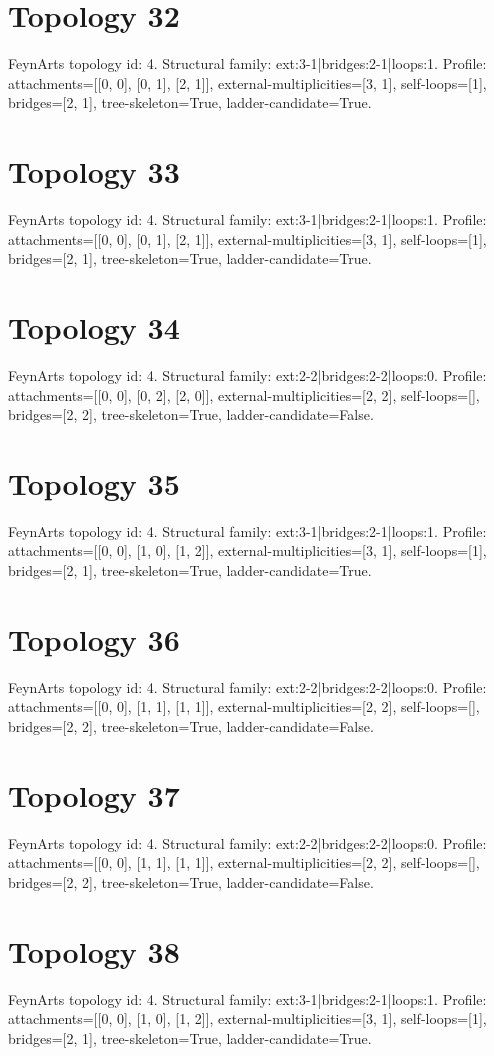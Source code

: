 \documentclass{article}
\begin{document}
\section*{Topology 32}
FeynArts topology id: 4.
Structural family: ext:3-1|bridges:2-1|loops:1.
Profile: attachments=[[0, 0], [0, 1], [2, 1]], external-multiplicities=[3, 1], self-loops=[1], bridges=[2, 1], tree-skeleton=True, ladder-candidate=True.
\section*{Topology 33}
FeynArts topology id: 4.
Structural family: ext:3-1|bridges:2-1|loops:1.
Profile: attachments=[[0, 0], [0, 1], [2, 1]], external-multiplicities=[3, 1], self-loops=[1], bridges=[2, 1], tree-skeleton=True, ladder-candidate=True.
\section*{Topology 34}
FeynArts topology id: 4.
Structural family: ext:2-2|bridges:2-2|loops:0.
Profile: attachments=[[0, 0], [0, 2], [2, 0]], external-multiplicities=[2, 2], self-loops=[], bridges=[2, 2], tree-skeleton=True, ladder-candidate=False.
\section*{Topology 35}
FeynArts topology id: 4.
Structural family: ext:3-1|bridges:2-1|loops:1.
Profile: attachments=[[0, 0], [1, 0], [1, 2]], external-multiplicities=[3, 1], self-loops=[1], bridges=[2, 1], tree-skeleton=True, ladder-candidate=True.
\section*{Topology 36}
FeynArts topology id: 4.
Structural family: ext:2-2|bridges:2-2|loops:0.
Profile: attachments=[[0, 0], [1, 1], [1, 1]], external-multiplicities=[2, 2], self-loops=[], bridges=[2, 2], tree-skeleton=True, ladder-candidate=False.
\section*{Topology 37}
FeynArts topology id: 4.
Structural family: ext:2-2|bridges:2-2|loops:0.
Profile: attachments=[[0, 0], [1, 1], [1, 1]], external-multiplicities=[2, 2], self-loops=[], bridges=[2, 2], tree-skeleton=True, ladder-candidate=False.
\section*{Topology 38}
FeynArts topology id: 4.
Structural family: ext:3-1|bridges:2-1|loops:1.
Profile: attachments=[[0, 0], [1, 0], [1, 2]], external-multiplicities=[3, 1], self-loops=[1], bridges=[2, 1], tree-skeleton=True, ladder-candidate=True.
\end{document}
